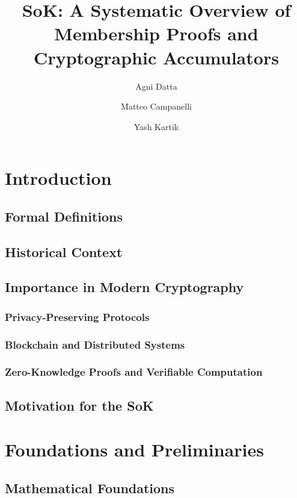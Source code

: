 \documentclass{iacrtrans}
\begin{document}
\title[SoK Commitments and Membership Proofs]{\bf SoK: A Systematic Overview of Membership Proofs and Cryptographic Accumulators}
\author{Agni Datta \and Matteo Campanelli \and Yash Kartik}
\date{}

\maketitle

\tableofcontents

\section{Introduction}
\subsection{Formal Definitions}
\subsection{Historical Context}
\subsection{Importance in Modern Cryptography}
\subsubsection{Privacy-Preserving Protocols}
\subsubsection{Blockchain and Distributed Systems}
\subsubsection{Zero-Knowledge Proofs and Verifiable Computation}
\subsection{Motivation for the SoK}

\section{Foundations and Preliminaries}

\subsection{Mathematical Foundations}
\end{document}
